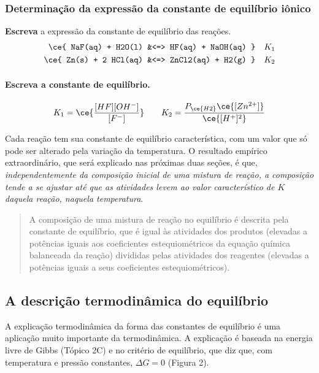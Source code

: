 \begin{example}

\subsubsection{Determinação da expressão da constante de equilíbrio iônico}

\textbf{Escreva} a expressão da constante de equilíbrio das reações. \[
\begin{aligned}
    \ce{ NaF(aq) + H2O(l) &<=> HF(aq) + NaOH(aq)  } && K_1 \\
    \ce{ Zn(s) + 2 HCl(aq) &<=> ZnCl2(aq) + H2(g) } && K_2
\end{aligned}
\]

\paragraph{Escreva a constante de equilíbrio.}

\[
    K_1 = \ce{ \frac{ [HF] [OH^-] }{ [F^-] } }
    \qquad
    K_2 = \dfrac{ P_{\ce{H2}} \ce{[Zn^{2+}]} }{ \ce{[H^+]^2} }
\]

\end{example}

Cada reação tem sua constante de equilíbrio característica, com um valor que só pode ser alterado pela variação da temperatura. O resultado empírico
extraordinário, que será explicado nas próximas duas seções, é que, \emph{independentemente da composição inicial de uma mistura de reação, a
composição tende a se ajustar até que as atividades levem ao valor característico de \(K\) daquela reação, naquela temperatura}.

\begin{quote}
A composição de uma mistura de reação no equilíbrio é descrita pela constante de equilíbrio, que é igual às atividades dos produtos (elevadas a
potências iguais aos coeficientes estequiométricos da equação química balanceada da reação) divididas pelas atividades dos reagentes (elevadas a
potências iguais a seus coeficientes estequiométricos).
\end{quote}

\subsection{A descrição termodinâmica do equilíbrio}

A explicação termodinâmica da forma das constantes de equilíbrio é uma aplicação muito importante da termodinâmica. A explicação é baseada na energia
livre de Gibbs (Tópico 2C) e no critério de equilíbrio, que diz que, com temperatura e pressão constantes, \(\Delta G = 0\) (Figura 2).

